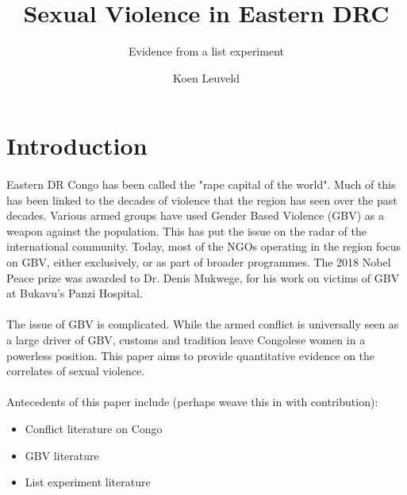 \documentclass[11pt,a4paper]{scrartcl} %
\begin{document}
\author{Koen Leuveld}




\title{Sexual Violence in Eastern DRC}
\subtitle{Evidence from a list experiment} %

\maketitle



\section*{Introduction}

\paragraph{}
Eastern DR Congo has been called the "rape capital of the world". Much of this has been linked to the decades of violence that the region has seen over the past decades. Various armed groups have used Gender Based Violence (GBV) as a weapon against the population. This has put the issue on the radar of the international community. Today, most of the NGOs operating in the region focus on GBV, either exclusively, or as part of broader programmes. The 2018 Nobel Peace prize was awarded to Dr. Denis Mukwege, for his work on victims of GBV at Bukavu's Panzi Hospital.

\paragraph{}
The issue of GBV is complicated. While the armed conflict is universally seen as a large driver of GBV, customs and tradition leave Congolese women in a powerless position. This paper aims to provide quantitative evidence on the correlates of sexual violence.

\paragraph{}
Antecedents of this paper include (perhaps weave this in with contribution):
\begin{itemize}
	\item Conflict literature on Congo
	\item GBV literature
	\item List experiment literature
\end{itemize}
\end{document}

